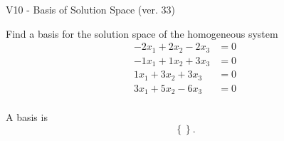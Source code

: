 \begin{exercise}
  \begin{exerciseTitle}V10 - Basis of Solution Space (ver. 33)\end{exerciseTitle}
  \begin{exerciseStatement}
    Find a basis for the solution space of the homogeneous system 
\begin{align*}
 -2 x_ 1 + 2 x_ 2 -2 x_ 3 &= 0  \\ 
  -1 x_ 1 + 1 x_ 2 + 3 x_ 3 &= 0  \\ 
  1 x_ 1 + 3 x_ 2 + 3 x_ 3 &= 0  \\ 
  3 x_ 1 + 5 x_ 2 -6 x_ 3 &= 0  \\ 
 \end{align*}


 
  \end{exerciseStatement}

  \begin{exerciseAnswer}
   A basis is   
\[\left\{\right\}.\]

  


  \end{exerciseAnswer}
\end{exercise}